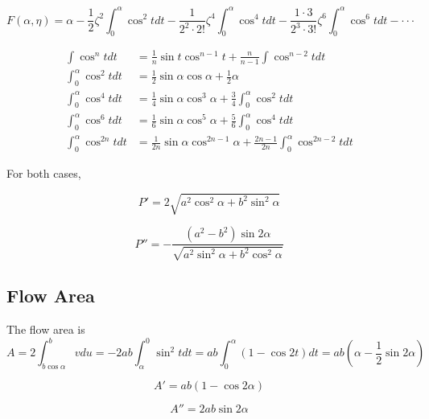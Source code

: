 \begin{equation}
F(\alpha, \eta) = \alpha - \frac{1}{2}\zeta^2\int_0^{\alpha} \cos ^2 t dt - \frac{1}{2^2 \cdot 2!}\zeta^4\int_0^{\alpha} \cos ^4 t dt - \frac{1 \cdot 3}{2^3 \cdot 3!}\zeta^6\int_0^{\alpha} \cos ^6 t dt - \cdot \cdot \cdot
\end{equation}

\begin{equation}
\begin{aligned}
\int \cos^n t dt &= \frac{1}{n} \sin t  \cos^{n-1} t + \frac{n}{n-1} \int \cos^{n-2} t dt \\
\int_0^\alpha \cos^2 t dt &= \frac{1}{2}\sin \alpha  \cos \alpha + \frac{1}{2} \alpha  \\
\int_0^\alpha \cos^4 t dt &= \frac{1}{4}\sin \alpha  \cos^3 \alpha + \frac{3}{4} \int_0^\alpha \cos^2 t dt \\
\int_0^\alpha \cos^6 t dt &= \frac{1}{6}\sin \alpha  \cos^5 \alpha + \frac{5}{6} \int_0^\alpha \cos^4 t dt \\
\int_0^\alpha \cos^{2n} t dt &= \frac{1}{2n}\sin \alpha  \cos^{2n-1} \alpha + \frac{2n-1}{2n} \int_0^\alpha \cos^{2n-2} t dt 
\end{aligned}
\end{equation}

For both cases,

\begin{equation}
P' = 2\sqrt{a^2\cos^2\alpha + b^2\sin^2\alpha} 
\end{equation}

\begin{equation}
P'' =-\frac{(a^2-b^2)\sin2\alpha}{\sqrt{a^2\sin^2\alpha + b^2\cos^2\alpha}} 
\end{equation}

\subsection{Flow Area}
The flow area is
\begin{equation}
A = 2 \int_{b\cos\alpha }^b v du = -2ab\int^0_\alpha \sin^2tdt =  ab\int_0^\alpha (1 - \cos 2t) dt = ab(\alpha - \frac{1}{2}\sin 2 \alpha)
\end{equation}

\begin{equation}
A' = ab(1 - \cos2\alpha)
\end{equation}

\begin{equation}
A'' = 2ab\sin2\alpha
\end{equation}

